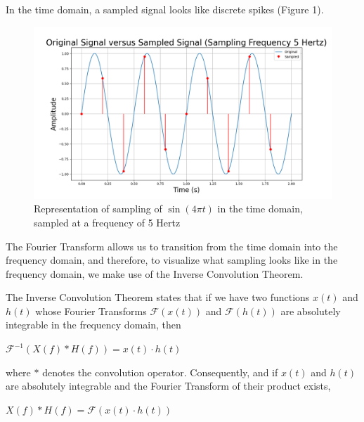\documentclass{article}
\begin{document}
In the time domain, a sampled signal looks like discrete spikes (Figure 1). 
\begin{figure} %
    \includegraphics[width=\linewidth]{images/ogvssampled_BIG.png}
    \caption{Representation of sampling of $\sin(4\pi t)$ in the time domain, sampled at a frequency of 5 Hertz}
    \label{fig:grid}

\end{figure}
The Fourier Transform allows us to transition from the time domain into the frequency domain, and therefore, to visualize what sampling looks like in the frequency domain, we make use of the Inverse Convolution Theorem.

The Inverse Convolution Theorem states that if we have two functions $x(t)$ and $h(t)$ whose Fourier Transforms $\mathcal{F}(x(t))$ and $\mathcal{F}(h(t))$ are absolutely integrable in the frequency domain,
then 
\begin{center}
    \begin{math}
        \mathcal{F}^{-1} \left(X(f) * H(f) \right) = x(t) \cdot h(t)
    \end{math}  
\end{center}
where $*$ denotes the convolution operator. 
Consequently, and if $x(t)$ and $h(t)$ are absolutely integrable and the Fourier Transform of their product exists,
\begin{center}
    \begin{math}
        X(f) * H(f) = \mathcal{F}\left(x(t) \cdot h(t)\right)
    \end{math}  
\end{center}
\end{document}
